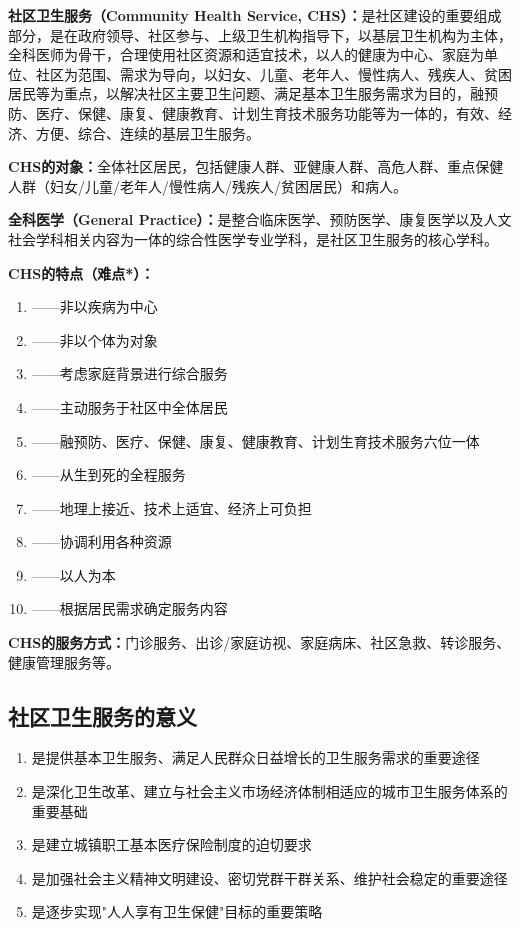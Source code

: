 \begin{keybox}
\textbf{社区卫生服务（Community Health Service, CHS）：}是社区建设的重要组成部分，是在政府领导、社区参与、上级卫生机构指导下，以基层卫生机构为主体，全科医师为骨干，合理使用社区资源和适宜技术，以人的健康为中心、家庭为单位、社区为范围、需求为导向，以妇女、儿童、老年人、慢性病人、残疾人、贫困居民等为重点，以解决社区主要卫生问题、满足基本卫生服务需求为目的，融预防、医疗、保健、康复、健康教育、计划生育技术服务功能等为一体的，有效、经济、方便、综合、连续的基层卫生服务。

\textbf{CHS的对象：}全体社区居民，包括健康人群、亚健康人群、高危人群、重点保健人群（妇女/儿童/老年人/慢性病人/残疾人/贫困居民）和病人。

\textbf{全科医学（General Practice）：}是整合临床医学、预防医学、康复医学以及人文社会学科相关内容为一体的综合性医学专业学科，是社区卫生服务的核心学科。

\textbf{CHS的特点（难点*）：}
\begin{enumerate}[leftmargin=*]
    \item {}——非以疾病为中心
    \item {}——非以个体为对象
    \item {}——考虑家庭背景进行综合服务
    \item {}——主动服务于社区中全体居民
    \item {}——融预防、医疗、保健、康复、健康教育、计划生育技术服务六位一体
    \item {}——从生到死的全程服务
    \item {}——地理上接近、技术上适宜、经济上可负担
    \item {}——协调利用各种资源
    \item {}——以人为本
    \item {}——根据居民需求确定服务内容
\end{enumerate}

\textbf{CHS的服务方式：}门诊服务、出诊/家庭访视、家庭病床、社区急救、转诊服务、健康管理服务等。
\end{keybox}

\subsection{社区卫生服务的意义}

\begin{defbox}
\begin{enumerate}[leftmargin=*]
    \item 是提供基本卫生服务、满足人民群众日益增长的卫生服务需求的重要途径
    \item 是深化卫生改革、建立与社会主义市场经济体制相适应的城市卫生服务体系的重要基础
    \item 是建立城镇职工基本医疗保险制度的迫切要求
    \item 是加强社会主义精神文明建设、密切党群干群关系、维护社会稳定的重要途径
    \item 是逐步实现"人人享有卫生保健"目标的重要策略
\end{enumerate}
\end{defbox}

